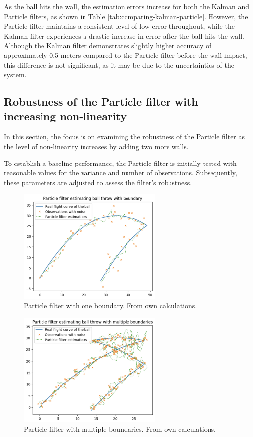 \documentclass[conference]{IEEEtran}
\begin{document}
As the ball hits the wall, the estimation errors increase for both the Kalman and Particle filters, as shown in Table \ref{tab:comparing-kalman-particle}.
However, the Particle filter maintains a consistent level of low error throughout, while the Kalman filter experiences a drastic increase in error after the ball hits the wall.
Although the Kalman filter demonstrates slightly higher accuracy of approximately 0.5 meters compared to the Particle filter before the wall impact, this difference is not significant, as it may be due to the uncertainties of the system.


\subsection{Robustness of the Particle filter with increasing non-linearity}

In this section, the focus is on examining the robustness of the Particle filter as the level of non-linearity increases by adding two more walls.

To establish a baseline performance, the Particle filter is initially tested with reasonable values for the variance and number of observations.
Subsequently, these parameters are adjusted to assess the filter's robustness.

\begin{figure}
	\centering
	\includegraphics[width=70mm]{figs/particle-filter-one-boundary}
	\caption{Particle filter with one boundary. From own calculations.}
	\label{fig:particle-filter-one-boundary}
\end{figure}
\begin{figure}
	\centering
	\includegraphics[width=70mm]{figs/particle-filter-multiple-boundaries}
	\caption{Particle filter with multiple boundaries. From own calculations.}
	\label{fig:particle-filter-multiple-boundaries}
\end{figure}
\end{document}
